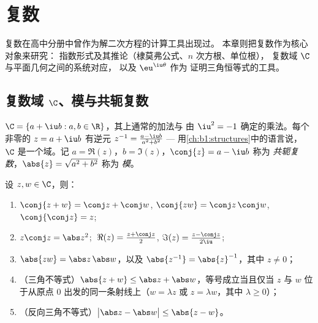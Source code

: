 \chapter{复数}\label{ch:b1:complex}

复数在高中分册中曾作为解二次方程的计算工具出现过。
本章则把复数作为核心对象来研究：
指数形式及其推论（棣莫弗公式、$n$ 次方根、单位根），
复数域 $\C$ 与平面几何之间的系统对应，
以及 $\eu^{\iu\theta}$ 作为
证明三角恒等式的工具。

\section{复数域 $\C$、模与共轭复数}

\begin{definition}[复数域]\label{def:b1:complex:field}
$\C = \{a + \iu b : a, b \in \R\}$，其上通常的加法与
由 $\iu^2 = -1$ 确定的乘法。每个非零的 $z = a + \iu
b$ 有逆元 $z^{-1} = \frac{a - \iu b}{a^2 + b^2}$ --- 用\cref{ch:b1:structures}中的语言说，
$\C$ 是一个域。记 $a =
\Re(z)$，$b = \Im(z)$，$\conj{z} = a - \iu b$ 称为
\emph{共轭复数}，$\abs{z} = \sqrt{a^2 + b^2}$ 称为
\emph{模}。
\end{definition}

\begin{proposition}[共轭与模的运算规则]\label{prop:b1:complex:rules}
设 $z, w \in \C$，则：
\begin{enumerate}
  \item $\conj{z + w} = \conj z + \conj w$, $\conj{zw} = \conj z\,
        \conj w$, $\conj{\conj z} = z$;
  \item $z \conj z = \abs z^2$; $\;\Re(z) = \frac{z + \conj z}{2}$,
        $\Im(z) = \frac{z - \conj z}{2\iu}$;
  \item $\abs{zw} = \abs z\, \abs w$，以及 $\abs{z^{-1}} =
        \abs{z}^{-1}$，其中 $z \neq 0$；
  \item （三角不等式）$\abs{z + w}
        \leq \abs z + \abs w$，等号成立当且仅当 $z$ 与
        $w$ 位于从原点 $0$ 出发的同一条射线上（$w = \lambda z$ 或
        $z = \lambda w$，其中 $\lambda \geq 0$）；
  \item （反向三角不等式）$\bigl|\abs z - \abs w\bigr|
        \leq \abs{z - w}$。
\end{enumerate}
\end{proposition}

